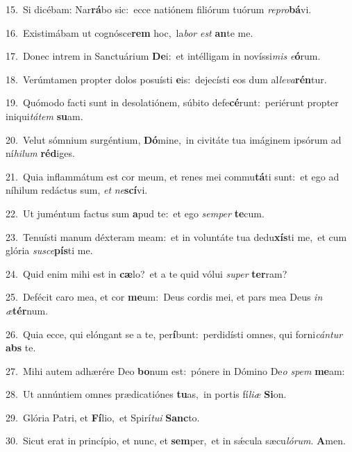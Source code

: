 {\numbfont\textcolor{\numbcolor}{15.}}~Si dicébam: Nar\-\textbf{rá}\-bo sic:~\star ecce natiónem filiórum tuórum \textit{re}\-\textit{pro}\textbf{bá}vi.\par
{\numbfont\textcolor{\numbcolor}{16.}}~Existimábam ut cognósce\textbf{rem} hoc,~\star la\textit{bor} \textit{est} \textbf{an}\-te me.\par
{\numbfont\textcolor{\numbcolor}{17.}}~Donec intrem in Sanctuárium \textbf{De}\-i:~\star et intélligam in novíssi\textit{mis} \textit{e}\-\textbf{ó}rum.\par
{\numbfont\textcolor{\numbcolor}{18.}}~Verúmtamen propter dolos posuísti \textbf{e}\-is:~\star dejecísti eos dum al\-\textit{le}\-\textit{va}\textbf{rén}tur.\par
{\numbfont\textcolor{\numbcolor}{19.}}~Quómodo facti sunt in desolatiónem, súbito defe\-\textbf{cé}\-runt:~\star periérunt propter iniqui\-\textit{tá}\-\textit{tem} \textbf{su}\-am.\par
{\numbfont\textcolor{\numbcolor}{20.}}~Velut sómnium surgéntium, \textbf{Dó}\-mine,~\star in civitáte tua imáginem ipsórum ad ní\-\textit{hi}\-\textit{lum} \textbf{réd}\-iges.\par
{\numbfont\textcolor{\numbcolor}{21.}}~Quia inflammátum est cor meum, et renes mei commu\-\textbf{tá}\-ti sunt:~\star et ego ad níhilum redáctus sum, \textit{et} \textit{ne}\-\textbf{scí}vi.\par
{\numbfont\textcolor{\numbcolor}{22.}}~Ut juméntum factus sum \textbf{a}\-pud te:~\star et ego \textit{sem}\-\textit{per} \textbf{te}\-cum.\par
{\numbfont\textcolor{\numbcolor}{23.}}~Tenuísti manum déxteram meam:~\dagger et in voluntáte tua dedu\-\textbf{xís}\-ti me,~\star et cum glória \textit{su}\-\textit{sce}\textbf{pís}ti me.\par
{\numbfont\textcolor{\numbcolor}{24.}}~Quid enim mihi est in \textbf{cæ}\-lo?~\star et a te quid vólui \textit{su}\-\textit{per} \textbf{ter}\-ram?\par
{\numbfont\textcolor{\numbcolor}{25.}}~Defécit caro mea, et cor \textbf{me}\-um:~\star Deus cordis mei, et pars mea Deus \textit{in} \textit{æ}\-\textbf{tér}num.\par
{\numbfont\textcolor{\numbcolor}{26.}}~Quia ecce, qui elóngant se a te, per\-\textbf{í}\-bunt:~\star perdidísti omnes, qui forni\-\textit{cán}\-\textit{tur} \textbf{abs} te.\par
{\numbfont\textcolor{\numbcolor}{27.}}~Mihi autem adhærére Deo \textbf{bo}\-num est:~\star pónere in Dómino De\textit{o} \textit{spem} \textbf{me}\-am:\par
{\numbfont\textcolor{\numbcolor}{28.}}~Ut annúntiem omnes prædicatiónes \textbf{tu}\-as,~\star in portis fí\-\textit{li}\-\textit{æ} \textbf{Si}\-on.\par
{\numbfont\textcolor{\numbcolor}{29.}}~Glória Patri, et \textbf{Fí}\-lio,~\star et Spirí\-\textit{tu}\-\textit{i} \textbf{Sanc}\-to.\par
{\numbfont\textcolor{\numbcolor}{30.}}~Sicut erat in princípio, et nunc, et \textbf{sem}\-per,~\star et in sǽcula sæcu\-\textit{ló}\-\textit{rum}. \textbf{A}\-men.\par
